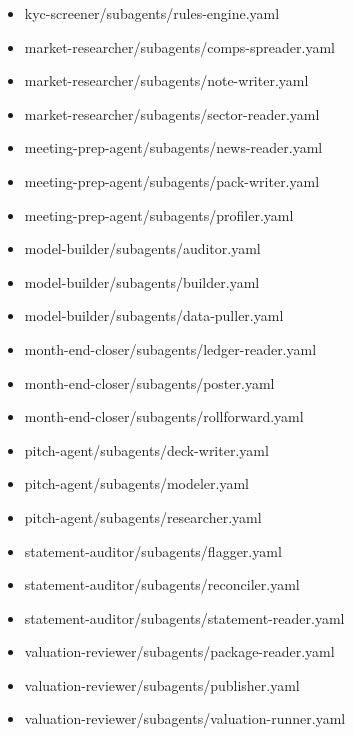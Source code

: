 \documentclass[11pt]{article}
\begin{document}
\begin{itemize}[leftmargin=*,itemsep=1pt,topsep=2pt]
\item \hspace*{1.8em}kyc-screener/subagents/rules-engine.yaml
\item \hspace*{1.8em}market-researcher/subagents/comps-spreader.yaml
\item \hspace*{1.8em}market-researcher/subagents/note-writer.yaml
\item \hspace*{1.8em}market-researcher/subagents/sector-reader.yaml
\item \hspace*{1.8em}meeting-prep-agent/subagents/news-reader.yaml
\item \hspace*{1.8em}meeting-prep-agent/subagents/pack-writer.yaml
\item \hspace*{1.8em}meeting-prep-agent/subagents/profiler.yaml
\item \hspace*{1.8em}model-builder/subagents/auditor.yaml
\item \hspace*{1.8em}model-builder/subagents/builder.yaml
\item \hspace*{1.8em}model-builder/subagents/data-puller.yaml
\item \hspace*{1.8em}month-end-closer/subagents/ledger-reader.yaml
\item \hspace*{1.8em}month-end-closer/subagents/poster.yaml
\item \hspace*{1.8em}month-end-closer/subagents/rollforward.yaml
\item \hspace*{1.8em}pitch-agent/subagents/deck-writer.yaml
\item \hspace*{1.8em}pitch-agent/subagents/modeler.yaml
\item \hspace*{1.8em}pitch-agent/subagents/researcher.yaml
\item \hspace*{1.8em}statement-auditor/subagents/flagger.yaml
\item \hspace*{1.8em}statement-auditor/subagents/reconciler.yaml
\item \hspace*{1.8em}statement-auditor/subagents/statement-reader.yaml
\item \hspace*{1.8em}valuation-reviewer/subagents/package-reader.yaml
\item \hspace*{1.8em}valuation-reviewer/subagents/publisher.yaml
\item \hspace*{1.8em}valuation-reviewer/subagents/valuation-runner.yaml
\end{itemize}
\end{document}
